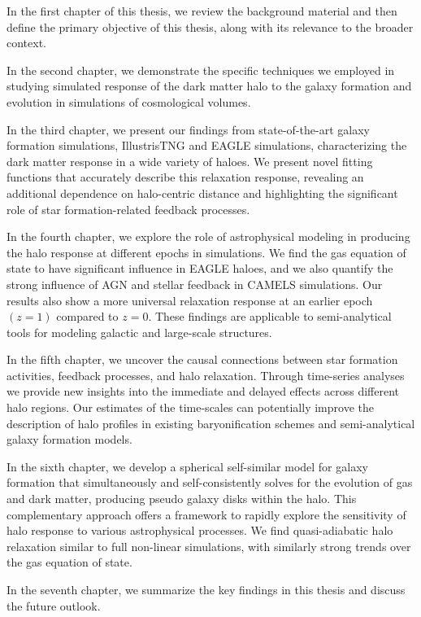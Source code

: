 \documentclass[a4paper, 12pt, oneside]{Thesis}  %
\begin{document}
In the first chapter of this thesis, we review the background material and then define the primary objective of this thesis, along with its relevance to the broader context.

In the second chapter, we demonstrate the specific techniques we employed in studying simulated response of the dark matter halo to the galaxy formation and evolution in simulations of cosmological volumes.

In the third chapter, we present our findings from state-of-the-art galaxy formation simulations, IllustrisTNG and EAGLE simulations, characterizing the dark matter response in a wide variety of haloes. We present novel fitting functions that accurately describe this relaxation response, revealing an additional dependence on halo-centric distance and highlighting the significant role of star formation-related feedback processes. 

In the fourth chapter, we explore the role of astrophysical modeling in producing the halo response at different epochs in simulations. We find the gas equation of state to have significant influence in EAGLE haloes, and we also quantify the strong influence of AGN and stellar feedback in CAMELS simulations. Our results also show a more universal relaxation response at an earlier epoch $(z=1)$ compared to $z=0$. These findings are applicable to semi-analytical tools for modeling galactic and large-scale structures. 

In the fifth chapter, we uncover the causal connections between star formation activities, feedback processes, and halo relaxation. Through time-series analyses we provide new insights into the immediate and delayed effects across different halo regions. Our estimates of the time-scales can potentially improve the description of halo profiles in existing baryonification schemes and semi-analytical galaxy formation models. 

In the sixth chapter, we develop a spherical self-similar model for galaxy formation that simultaneously and self-consistently solves for the evolution of gas and dark matter, producing pseudo galaxy disks within the halo. This complementary approach offers a framework to rapidly explore the sensitivity of halo response to various astrophysical processes. We find quasi-adiabatic halo relaxation similar to full non-linear simulations, with similarly strong trends over the gas equation of state.

In the seventh chapter, we summarize the key findings in this thesis and discuss the future outlook.
\end{document}
